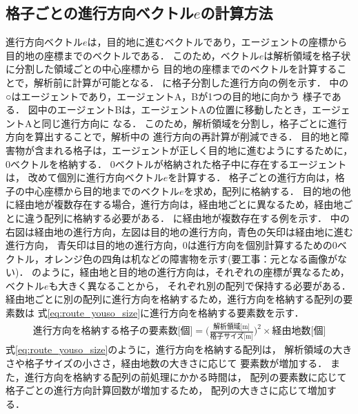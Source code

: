 
\subsection{格子ごとの進行方向ベクトル$e$の計算方法}
進行方向ベクトル$e$は，目的地に進むベクトルであり，エージェントの座標から
目的地の座標までのベクトルである．
このため，ベクトル$e$は解析領域を格子状に分割した領域ごとの中心座標から
目的地の座標までのベクトルを計算することで，解析前に計算が可能となる．
に格子分割した進行方向の例を示す．
%
%
中の○はエージェントであり，エージェントA，Bが1つの目的地に向かう
様子である．
図中のエージェントBは，エージェントAの位置に移動したとき，エージェントAと同じ進行方向に
なる．
このため，解析領域を分割し，格子ごとに進行方向を算出することで，解析中の
進行方向の再計算が削減できる．
目的地と障害物が含まれる格子は，エージェントが正しく目的地に進むようにするために，
0ベクトルを格納する．
0ベクトルが格納された格子中に存在するエージェントは，
改めて個別に進行方向ベクトル$e$を計算する．
格子ごとの進行方向は，格子の中心座標から目的地までのベクトル$e$を求め，配列に格納する．
目的地の他に経由地が複数存在する場合，進行方向は，経由地ごとに異なるため，経由地ごとに違う配列に格納する必要がある．
に経由地が複数存在する例を示す．
中の右図は経由地の進行方向，左図は目的地の進行方向，青色の矢印は経由地に進む進行方向，
青矢印は目的地の進行方向，0は進行方向を個別計算するための0ベクトル，オレンジ色の四角は机などの障害物を示す(要工事：元となる画像がない)．
のように，経由地と目的地の進行方向は，それぞれの座標が異なるため，ベクトル$e$も大きく異なることから，
それぞれ別の配列で保持する必要がある．
経由地ごとに別の配列に進行方向を格納するため，進行方向を格納する配列の要素数は
式\eqref{eq:route_youso_size}に進行方向を格納する要素数を示す．
%
\begin{eqnarray}
 \mbox{進行方向を格納する格子の要素数[個]} =  \Big( \frac{\mbox{解析領域[m]}}{\mbox{格子サイズ[m]}} \Big) ^ 2 \times  \mbox{経由地数[個]}
 \label{eq:route_youso_size}
\end{eqnarray}
%
式\eqref{eq:route_youso_size}のように，進行方向を格納する配列は，
解析領域の大きさや格子サイズの小ささ，経由地数の大きさに応じて
要素数が増加する．
また，進行方向を格納する配列の前処理にかかる時間は，
配列の要素数に応じて格子ごとの進行方向計算回数が増加するため，
配列の大きさに応じて増加する．

